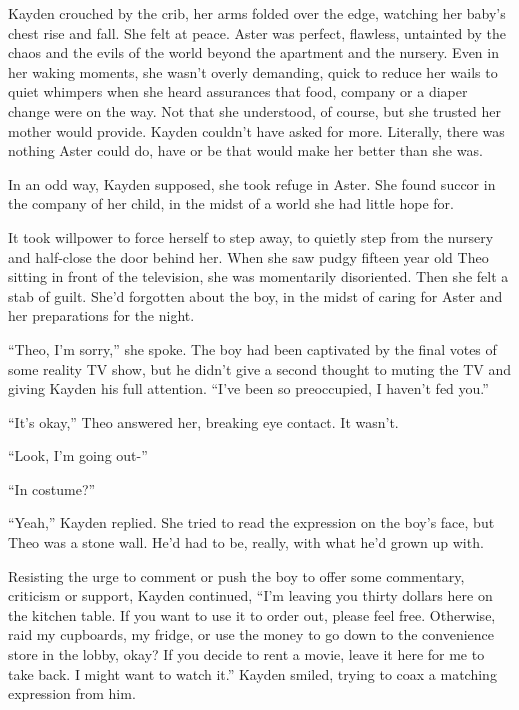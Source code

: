 





Kayden crouched by the crib, her arms folded over the edge, watching her baby's chest rise and fall.  She felt at peace.  Aster was perfect, flawless, untainted by the chaos and the evils of the world beyond the apartment and the nursery.  Even in her waking moments, she wasn't overly demanding, quick to reduce her wails to quiet whimpers when she heard assurances that food, company or a diaper change were on the way.  Not that she understood, of course, but she trusted her mother would provide.  Kayden couldn't have asked for more.  Literally, there was nothing Aster could do, have or be that would make her better than she was.



In an odd way, Kayden supposed, she took refuge in Aster.  She found succor in the company of her child, in the midst of a world she had little hope for.



It took willpower to force herself to step away, to quietly step from the nursery and half-close the door behind her.  When she saw pudgy fifteen year old Theo sitting in front of the television, she was momentarily disoriented. Then she felt a stab of guilt.  She'd forgotten about the boy, in the midst of caring for Aster and her preparations for the night.



``Theo, I'm sorry,'' she spoke.  The boy had been captivated by the final votes of some reality TV show, but he didn't give a second thought to muting the TV and giving Kayden his full attention.  ``I've been so preoccupied, I haven't fed you.''



``It's okay,'' Theo answered her, breaking eye contact.  It wasn't.



``Look, I'm going out-''



``In costume?''



``Yeah,'' Kayden replied.  She tried to read the expression on the boy's face, but Theo was a stone wall.  He'd had to be, really, with what he'd grown up with.



Resisting the urge to comment or push the boy to offer some commentary, criticism or support, Kayden continued, ``I'm leaving you thirty dollars here on the kitchen table.  If you want to use it to order out, please feel free.  Otherwise, raid my cupboards, my fridge, or use the money to go down to the convenience store in the lobby, okay?  If you decide to rent a movie, leave it here for me to take back.  I might want to watch it.''  Kayden smiled, trying to coax a matching expression from him.



